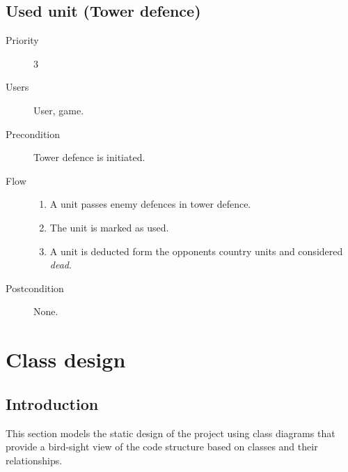 \documentclass[12pt,a4paper]{article}
\let\stdsection\section
\renewcommand\section{\newpage\stdsection}
\begin{document}
\subsection{Used unit (Tower defence)}
\begin{description}
\item[Priority] 3
\item[Users] User, game.
\item[Precondition] Tower defence is initiated.
\item[Flow]\mbox{}
  \begin{enumerate}
  \item A unit passes enemy defences in tower defence.
  \item The unit is marked as used.
  \item A unit is deducted form the opponents country units and
    considered \emph{dead}.
  \end{enumerate}
\item[Postcondition] None.
\end{description}


\onecolumn


\section{Class design}

\subsection{Introduction}
This section models the static design of the project using class
diagrams that provide a bird-sight view of the code structure based on
classes and their relationships.
\end{document}
